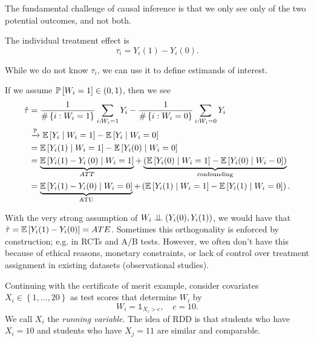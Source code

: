 The fundamental challenge of causal inference is that we only see only of the two potential outcomes, and not both.

\begin{definition}
	The individual treatment effect is \[
		\tau_i = Y_i(1) - Y_i(0)
	.\]
\end{definition}

While we do not know $\tau_i$, we can use it to define estimands of interest.

If we assume $\P\left[W_i = 1\right] \in (0,1)$, then we see \begin{align*}
	\hat{\tau} &= \frac{1}{\# \left\{i: W_i = 1\right\}} \sum\limits_{i: W_i = 1}^{} Y_i - \frac{1}{\# \left\{i: W_i = 0\right\}}\sum\limits_{i:W_i = 0}^{} Y_i\\
			   &\xrightarrow{\P} \E\left[Y_i \mid W_i = 1\right] - \E\left[Y_i \mid W_i = 0\right] \\
			   &= \E\left[Y_i(1) \mid W_i = 1\right] - \E\left[Y_i(0) \mid W_i = 0\right]  \\
			   &= \underbrace{\E\left[Y_i(1) - Y_i\left( 0 \right) \mid W_i = 1\right]}_{ATT}  + \underbrace{\left(\E\left[Y_i(0) \mid W_i = 1\right] - \E\left[Y_i(0) \mid W_i - 0\right]  \right)}_{\text{confounding}} \\
			   &= \underbrace{\E\left[Y_i(1) - Y_i(0) \mid W_i = 0\right]}_{\text{ATU}}+ \left( \E\left[Y_i(1) \mid W_i = 1\right] - \E\left[Y_i(1) \mid W_i = 0\right]  \right)
.\end{align*} 

With the very strong assumption of $W_i \ind \left(Y_i(0), Y_i(1)\right)$, we would have that $\hat{\tau} = \E\left[Y_i(1) - Y_i(0)\right] = ATE$.
Sometimes this orthogonality is enforced by construction; e.g. in RCTs and A/B tests.
However, we often don't have this because of ethical reasons, monetary constraints, or lack of control over treatment assignment in existing datasets (observational studies).

\begin{example}
	Continuing with the certificate of merit example, consider covariates $X_i \in \left\{1,\ldots,20\right\}$ as test scores that determine $W_i$ by \[
		W_i = \mathds{1}_{X_i > c}, \quad c =10
	.\] 
	We call $X_i$ the \emph{running variable}. The idea of RDD is that students who have $X_i =10$ and students who have $X_j = 11$ are similar and comparable. 
\end{example}

